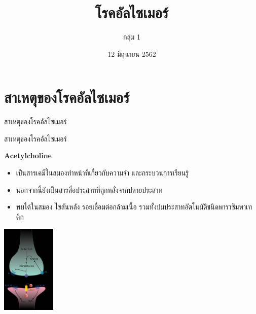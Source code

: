\documentclass[xetex,serif]{beamer}
\title{โรคอัลไซเมอร์}
\author{กลุ่ม 1}
\date{12 มิถุนายน 2562}
\institute{ห้อง 39}
\begin{document}
\begin{frame}
  \maketitle
\end{frame}

\section{สาเหตุของโรคอัลไซเมอร์}

\begin{frame}{สาเหตุของโรคอัลไซเมอร์}

\begin{center}
\end{center}

\end{frame}

\begin{frame}{สาเหตุของโรคอัลไซเมอร์}

  {\large \textbf{Acetylcholine}}
  \begin{itemize}
    \item เป็นสารเคมีในสมองทำหน้าที่เกี่ยวกับความจำ และกระบวนการเรียนรู้
    \item นอกจากนี้ยังเป็นสารสื่อประสาทที่ถูกหลั่งจากปลายประสาท
    \item พบได้ในสมอง ไขสันหลัง รอยเชื่อมต่อกล้ามเนื้อ รวมทั้งปมประสาทอัตโนมัติชนิดพาราซิมพาเทติก
  \end{itemize}
  \begin{center}
    \includegraphics[height=120pt]{img0.jpg}
  \end{center}
\end{frame}
\end{document}
